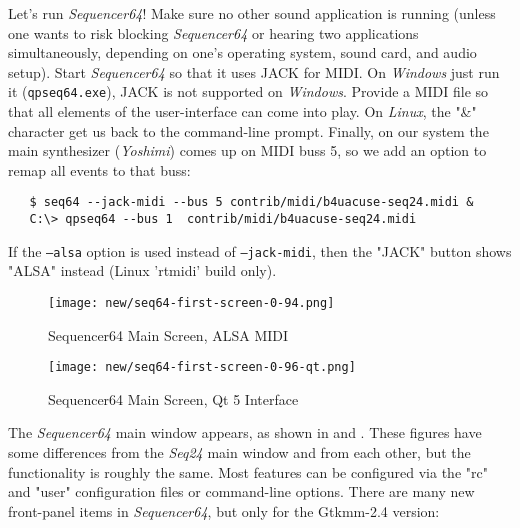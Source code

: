 \documentclass[
 11pt,
 twoside,
 a4paper,
 headinclude,
 footinclude,
 final                                 %
]{article}
\begin{document}
   Let's run \textsl{Sequencer64}!
   Make sure no other sound application is running
   (unless one wants to risk blocking \textsl{Sequencer64} or hearing two
   applications simultaneously, depending on one's operating system,
   sound card, and audio setup).
   Start \textsl{Sequencer64} so that it uses JACK for MIDI.
   On \textsl{Windows} just run it (\texttt{qpseq64.exe}), JACK is not
   supported on \textsl{Windows}.
   Provide a MIDI file so that all elements of the user-interface can come
   into play.  On \textsl{Linux}, the "\&" character get us back to the
   command-line prompt.  Finally, on our system the main synthesizer
   (\textsl{Yoshimi}) comes up on MIDI buss 5, so we add an option to remap
   all events to that buss:

\begin{verbatim}
   $ seq64 --jack-midi --bus 5 contrib/midi/b4uacuse-seq24.midi &
   C:\> qpseq64 --bus 1  contrib/midi/b4uacuse-seq24.midi
\end{verbatim}

   If the \texttt{--alsa} option is used instead of
   \texttt{--jack-midi}, then the "JACK" button shows "ALSA" instead
   (Linux 'rtmidi' build only).

\begin{figure}[H]
   \centering 
   \texttt{[image: new/seq64-first-screen-0-94.png]}
   \caption{Sequencer64 Main Screen, ALSA MIDI}
   \label{fig:seq64_main_screen}
\end{figure}

\begin{figure}[H]
   \centering 
   \texttt{[image: new/seq64-first-screen-0-96-qt.png]}
   \caption{Sequencer64 Main Screen, Qt 5 Interface}
   \label{fig:seq64_main_screen_qt}
\end{figure}

   The \textsl{Sequencer64} main window appears, as shown in
    and
   .
   These figures have some differences from the \textsl{Seq24} main window
   and from each other, but the functionality is roughly the same.
   Most features can be configured via the "rc" and "user"
   configuration files or command-line options.
   There are many new front-panel items in \textsl{Sequencer64}, but only for
   the Gtkmm-2.4 version:
\end{document}

